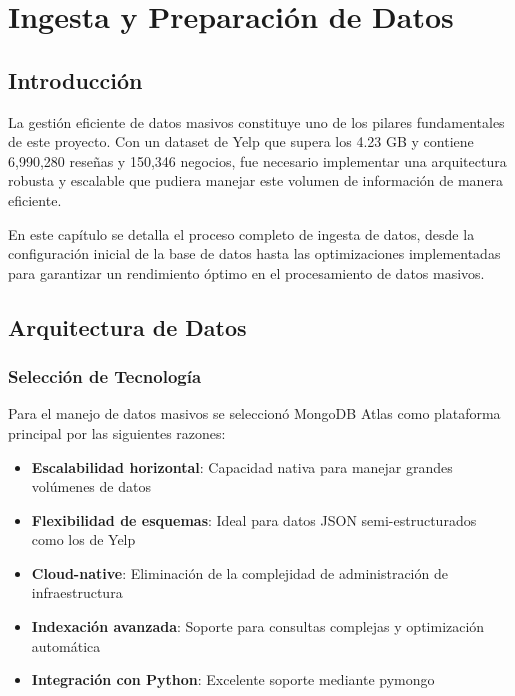 \documentclass[12pt,a4paper,twoside,openany]{book}
\begin{document}
\chapter{Ingesta y Preparación de Datos}

\section{Introducción}

La gestión eficiente de datos masivos constituye uno de los pilares fundamentales de este proyecto. Con un dataset de Yelp que supera los 4.23 GB y contiene 6,990,280 reseñas y 150,346 negocios, fue necesario implementar una arquitectura robusta y escalable que pudiera manejar este volumen de información de manera eficiente.

En este capítulo se detalla el proceso completo de ingesta de datos, desde la configuración inicial de la base de datos hasta las optimizaciones implementadas para garantizar un rendimiento óptimo en el procesamiento de datos masivos.

\section{Arquitectura de Datos}

\subsection{Selección de Tecnología}

Para el manejo de datos masivos se seleccionó MongoDB Atlas como plataforma principal por las siguientes razones:

\begin{itemize}
    \item \textbf{Escalabilidad horizontal}: Capacidad nativa para manejar grandes volúmenes de datos
    \item \textbf{Flexibilidad de esquemas}: Ideal para datos JSON semi-estructurados como los de Yelp
    \item \textbf{Cloud-native}: Eliminación de la complejidad de administración de infraestructura
    \item \textbf{Indexación avanzada}: Soporte para consultas complejas y optimización automática
    \item \textbf{Integración con Python}: Excelente soporte mediante pymongo
\end{itemize}
\end{document}
